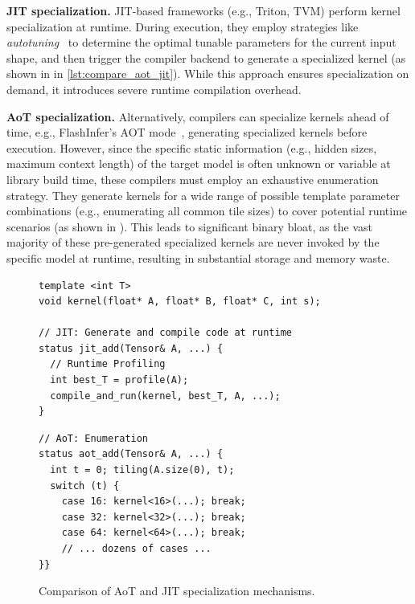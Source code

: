 \textbf{JIT specialization.} 
JIT-based frameworks (e.g., Triton, TVM) perform kernel specialization at runtime. 
During execution, they employ strategies like \textit{autotuning}~\cite{chen2018autotvm,zheng2020ansor} to determine the optimal tunable parameters for the current input shape, and then trigger the compiler backend to generate a specialized kernel (as shown in  in \autoref{lst:compare_aot_jit}).
While this approach ensures specialization on demand, it introduces severe runtime compilation overhead.

\textbf{AoT specialization.}
Alternatively, compilers can specialize kernels ahead of time, e.g., FlashInfer's AOT mode~\cite{ye2025flashinfer}, generating specialized kernels before execution.
However, since the specific static information (e.g., hidden sizes, maximum context length) of the target model is often unknown or variable at library build time, these compilers must employ an exhaustive enumeration strategy.
They generate kernels for a wide range of possible template parameter combinations (e.g., enumerating all common tile sizes) to cover potential runtime scenarios (as shown in ).
This leads to significant binary bloat, as the vast majority of these pre-generated specialized kernels are never invoked by the specific model at runtime, resulting in substantial storage and memory waste.

\begin{figure}[htbp]
\begin{minipage}{0.51\textwidth}
\begin{lstlisting}[basicstyle=\ttfamily\footnotesize, captionpos=b, frame=single]
template <int T>
void kernel(float* A, float* B, float* C, int s);

// JIT: Generate and compile code at runtime
status jit_add(Tensor& A, ...) {
  // Runtime Profiling
  int best_T = profile(A);
  compile_and_run(kernel, best_T, A, ...);
}
\end{lstlisting}
\end{minipage}
\hfill
\begin{minipage}{0.45\textwidth}
\begin{lstlisting}[firstnumber=10, basicstyle=\ttfamily\footnotesize, captionpos=b, frame=single]
// AoT: Enumeration
status aot_add(Tensor& A, ...) {
  int t = 0; tiling(A.size(0), t);
  switch (t) {
    case 16: kernel<16>(...); break;
    case 32: kernel<32>(...); break;
    case 64: kernel<64>(...); break;
    // ... dozens of cases ...
}}
\end{lstlisting}
\end{minipage}
\caption{Comparison of AoT and JIT specialization mechanisms.}
\label{lst:compare_aot_jit}
\end{figure}

